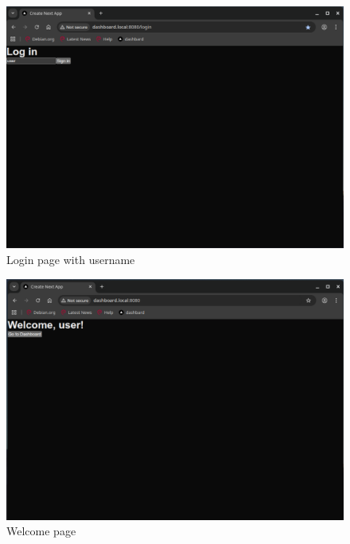 \documentclass[11pt, a4paper, oneside, listof=totoc]{scrartcl}
\begin{document}
                \begin{figure}[h!]
                    \centering
                    \includegraphics[width=\textwidth]{screenshots/eval/dashboardfe/dashboardfe-login-page-with-username.png}
                    \caption{Login page with username}\label{fig:dashboardfe-login-page-with-username}
                \end{figure}

                \begin{figure}[h!]
                    \centering
                    \includegraphics[width=\textwidth]{screenshots/eval/dashboardfe/dashboardfe-welcome-page.png}
                    \caption{Welcome page}\label{fig:dashboardfe-welcome-page}
                \end{figure}
\end{document}
